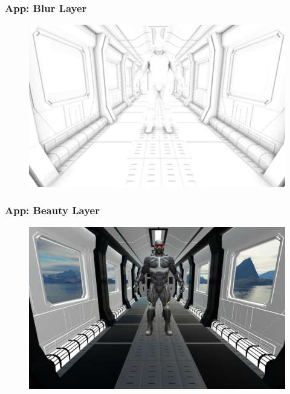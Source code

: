 \documentclass{beamer}
\begin{document}
\begin{frame}
\frametitle{App: Blur Layer}
\begin{figure}
    \centering
    \includegraphics[width=\resultwidth]{images/app_blur}
\end{figure}

\end{frame}

\begin{frame}
\frametitle{App: Beauty Layer}
\begin{figure}
    \centering
    \includegraphics[width=\resultwidth]{images/app_beauty}
\end{figure}

\end{frame}
\end{document}
